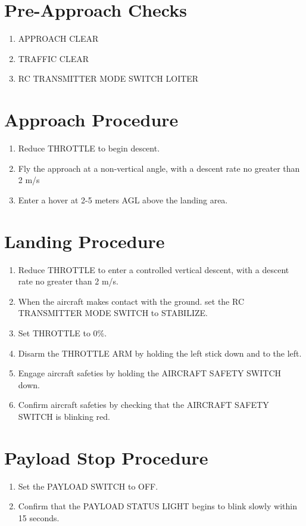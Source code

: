 \documentclass{report}
\begin{document}
	\section{Pre-Approach Checks}
		\begin{enumerate}
			\item APPROACH \hrulefill CLEAR
			\item TRAFFIC \hrulefill CLEAR
			\item RC TRANSMITTER MODE SWITCH \hrulefill LOITER
		\end{enumerate}
	\section{Approach Procedure}
		\begin{enumerate}
			\item Reduce THROTTLE to begin descent.
			\item Fly the approach at a non-vertical angle, with a descent rate no greater than 2 m/s
			\item Enter a hover at 2-5 meters AGL above the landing area.
		\end{enumerate}
	\section{Landing Procedure}
		\begin{enumerate}
			\item Reduce THROTTLE to enter a controlled vertical descent, with a descent rate no greater than 2 m/s.
			\item When the aircraft makes contact with the ground. set the RC TRANSMITTER MODE SWITCH to STABILIZE.
			\item Set THROTTLE to 0\%.
			\item Disarm the THROTTLE ARM by holding the left stick down and to the left.
			\item Engage aircraft safeties by holding the AIRCRAFT SAFETY SWITCH down.
			\item Confirm aircraft safeties by checking that the AIRCRAFT SAFETY SWITCH is blinking red.
		\end{enumerate}
	\section{Payload Stop Procedure}
		\begin{enumerate}
			\item Set the PAYLOAD SWITCH to OFF.
			\item Confirm that the PAYLOAD STATUS LIGHT begins to blink slowly within 15 seconds.
		\end{enumerate}
\end{document}
